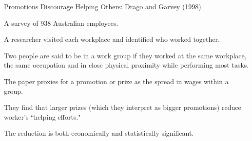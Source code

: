 \documentclass[aspectratio=169,usenames,dvipsnames]{beamer}
\newenvironment{wideitemize}{\itemize\addtolength{\itemsep}{10pt}}{\enditemize}
\begin{document}
\begin{frame}{Promotions Discourage Helping Others: Drago and Garvey (1998)}
\begin{wideitemize}
    \item A survey of 938 Australian employees.
    \item A researcher visited each workplace and identified who worked together.
    \item Two people are said to be in a work group if they worked at the same workplace, the same occupation and in close physical proximity while performing most tasks.
    \item The paper proxies for a promotion or prize as the spread in wages within a group.
    \item They find that larger prizes (which they interpret as bigger promotions) reduce worker's ``helping efforts."
    \item The reduction is both economically and statistically significant.
\end{wideitemize}
    
\end{frame}

\end{document}
